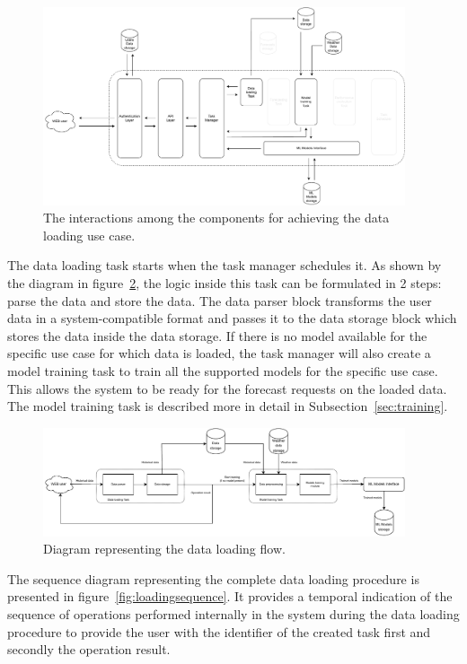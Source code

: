 \begin{figure}[H]
\centering
\includegraphics[width=0.95\textwidth]{images/architecture_data_loading_interactions}
\caption{The interactions among the components for achieving the data loading use case.}
\label{fig:loadinginteractions}
\end{figure}

The data loading task starts when the task manager schedules it.
As shown by the diagram in figure~\ref{fig:loadingflow}, the logic inside this task can be formulated in 2 steps: parse the data and store the data.
The data parser block transforms the user data in a system-compatible format and passes it to the data storage block which stores the data inside the data storage.
If there is no model available for the specific use case for which data is loaded, the task manager will also create a model training task to train all the supported models for the specific use case.
This allows the system to be ready for the forecast requests on the loaded data.
The model training task is described more in detail in Subsection~\ref{sec:training}.

\begin{figure}[H]
\centering
\includegraphics[width=0.95\textwidth]{images/architecture_data_loading_flow}
\caption{Diagram representing the data loading flow.}
\label{fig:loadingflow}
\end{figure}

The sequence diagram representing the complete data loading procedure is presented in figure~\ref{fig:loadingsequence}.
It provides a temporal indication of the sequence of operations performed internally in the system during the data loading procedure to provide the user with the identifier of the created task first and secondly the operation result.

